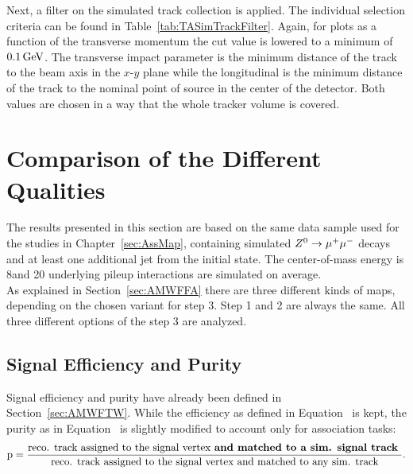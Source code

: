 

Next, a filter on the simulated track collection is applied. The individual selection criteria can be found in Table~\ref{tab:TASimTrackFilter}. Again, for plots as a function of the transverse momentum the cut value is lowered to a minimum \pt{} of $0.1\,\text{Ge\hspace{-.08em}V}$. The transverse impact parameter is the minimum distance of the track to the beam axis in the $x$-$y$ plane while the longitudinal is the minimum distance of the track to the nominal point of source in the center of the detector. Both values are chosen in a way that the whole tracker volume is covered.\\



\section{Comparison of the Different Qualities \label{sec:TASEFRDQ}}

The results presented in this section are based on the same data sample used for the studies in Chapter~\ref{sec:AssMap}, containing simulated ${Z^{0}}\rightarrow\mu^+\mu^-$ decays and at least one additional jet from the initial state. The center-of-mass energy is 8\TeV and 20 underlying pileup interactions are simulated on average. \\
As explained in Section~\ref{sec:AMWFFA} there are three different kinds of maps, depending on the chosen variant for step 3. Step 1 and 2 are always the same. All three different options of the step 3 are analyzed.

\subsection{Signal Efficiency and Purity \label{sec:TASEFR}}

Signal efficiency and purity have already been defined in Section~\ref{sec:AMWFTW}. While the efficiency as defined in Equation~ is kept, the purity as in Equation~ is slightly modified to account only for association tasks:
\begin{equation}
    \textrm{p} = \frac{ \textrm{reco. track assigned to the signal vertex \textbf{and matched to a sim. signal track} } }{ \textrm{reco. track assigned to the signal vertex and matched to any sim. track} }.
    \label{eq:AssPurity}
\end{equation}

